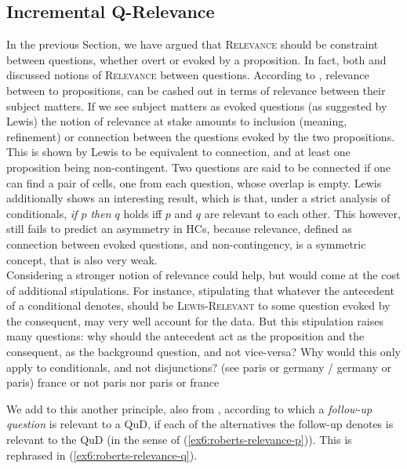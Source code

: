 \subsection{Incremental Q-Relevance}

In the previous Section, we have argued that \textsc{Relevance} should be constraint between questions, whether overt or evoked by a proposition. In fact, both \citet{Lewis1988} and \citet{Roberts2012} discussed notions of \textsc{Relevance} between questions. According to \citet{Lewis1988}, relevance between to propositions, can be cashed out in terms of relevance between their subject matters. If we see subject matters as evoked questions (as suggested by Lewis) the notion of relevance at stake amounts to inclusion (meaning, refinement) or connection between the questions evoked by the two propositions. This is shown by Lewis to be equivalent to connection, and at least one proposition being non-contingent. Two questions are said to be connected if one can find a pair of cells, one from each question, whose overlap is empty. Lewis additionally shows an interesting result, which is that, under a strict analysis of conditionals, \textit{if $p$ then $q$} holds iff $p$ and $q$ are relevant to each other. This however, still fails to predict an asymmetry in HCs, because relevance, defined as connection between evoked questions, and non-contingency, is a symmetric concept, that is also very weak. \\

Considering a stronger notion of relevance could help, but would come at the cost of additional stipulations. For instance, stipulating that whatever the antecedent of a conditional denotes, should be \textsc{Lewis-Relevant} to some question evoked by the consequent, may very well account for the data. But this stipulation raises many questions: why should the antecedent act as the proposition and the consequent, as the background question, and not vice-versa? Why would this only apply to conditionals, and not disjunctions? (see paris or germany / germany or paris)
france or not paris
nor paris or france

We add to this another principle, also from \citet{Roberts2012}, according to which a \textit{follow-up question} is relevant to a QuD, if each of the alternatives the follow-up denotes is relevant to the QuD (in the sense of (\ref{ex6:roberts-relevance-p})). This is rephrased in (\ref{ex6:roberts-relevance-q}).


